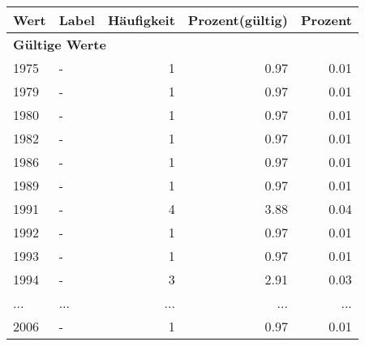      \begin{longtable}{lXrrr}
     \toprule
     \textbf{Wert} & \textbf{Label} & \textbf{Häufigkeit} & \textbf{Prozent(gültig)} & \textbf{Prozent} \\
     \endhead
     \midrule
     \multicolumn{5}{l}{\textbf{Gültige Werte}}\\
        1975 & \multicolumn{1}{X}{-} & %
          \num{1} &
          \num[round-mode=places,round-precision=2]{0.97} &
          \num[round-mode=places,round-precision=2]{0.01} \\
        1979 & \multicolumn{1}{X}{-} & %
          \num{1} &
          \num[round-mode=places,round-precision=2]{0.97} &
          \num[round-mode=places,round-precision=2]{0.01} \\
        1980 & \multicolumn{1}{X}{-} & %
          \num{1} &
          \num[round-mode=places,round-precision=2]{0.97} &
          \num[round-mode=places,round-precision=2]{0.01} \\
        1982 & \multicolumn{1}{X}{-} & %
          \num{1} &
          \num[round-mode=places,round-precision=2]{0.97} &
          \num[round-mode=places,round-precision=2]{0.01} \\
        1986 & \multicolumn{1}{X}{-} & %
          \num{1} &
          \num[round-mode=places,round-precision=2]{0.97} &
          \num[round-mode=places,round-precision=2]{0.01} \\
        1989 & \multicolumn{1}{X}{-} & %
          \num{1} &
          \num[round-mode=places,round-precision=2]{0.97} &
          \num[round-mode=places,round-precision=2]{0.01} \\
        1991 & \multicolumn{1}{X}{-} & %
          \num{4} &
          \num[round-mode=places,round-precision=2]{3.88} &
          \num[round-mode=places,round-precision=2]{0.04} \\
        1992 & \multicolumn{1}{X}{-} & %
          \num{1} &
          \num[round-mode=places,round-precision=2]{0.97} &
          \num[round-mode=places,round-precision=2]{0.01} \\
        1993 & \multicolumn{1}{X}{-} & %
          \num{1} &
          \num[round-mode=places,round-precision=2]{0.97} &
          \num[round-mode=places,round-precision=2]{0.01} \\
        1994 & \multicolumn{1}{X}{-} & %
          \num{3} &
          \num[round-mode=places,round-precision=2]{2.91} &
          \num[round-mode=places,round-precision=2]{0.03} \\
       ... & ... & ... & ... & ... \\
        2006 & \multicolumn{1}{X}{-} & %
          \num{1} &
          \num[round-mode=places,round-precision=2]{0.97} &
          \num[round-mode=places,round-precision=2]{0.01} \\


\end{longtable}
